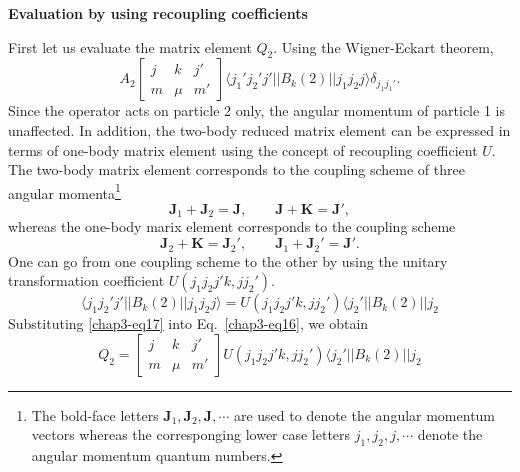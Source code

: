 \medskip
\noindent \textbf{\large Evaluation by using recoupling coefficients}
\medskip

\noindent First let us evaluate the matrix element $Q_2$. Using the Wigner-Eckart theorem,
\begin{equation}
A_2 \begin{bmatrix}j & k & j'\\m & \mu & m'\end{bmatrix}
\langle j_1' j_2' j' || B_k (2) || j_1 j_2 j \rangle \delta_{j_1 j_1'}. \label{chap3-eq16}
\end{equation}
Since the operator acts on particle 2 only, the angular momentum of particle 1 is unaffected. In addition, the two-body reduced matrix element can be expressed in terms of one-body matrix element using the concept of recoupling coefficient $U$. The two-body matrix element corresponds to the coupling scheme of three angular momenta\footnote{The bold-face letters ${\boldsymbol  J}_1, {\boldsymbol  J}_2, {\boldsymbol  J}, \cdots$ are used to denote the angular momentum vectors whereas the corresponging lower case letters $j_1, j_2, j, \cdots$ denote the angular momentum quantum numbers.}
$$
{\boldsymbol  J}_1 + {\boldsymbol  J}_2 = {\boldsymbol  J}, \qquad {\boldsymbol  J}+ {\boldsymbol  K}= {\boldsymbol  J}',
$$
whereas the one-body marix element corresponds to the coupling scheme
$$
{\boldsymbol  J}_2 + {\boldsymbol  K} = {\boldsymbol  J}_2', \qquad {\boldsymbol  J}_1+ {\boldsymbol  J}_2'= {\boldsymbol  J}'.
$$
One can go from one coupling scheme to the other by using the unitary transformation coefficient $U(j_1 j_2 j' k, j j_2')$.
\begin{equation}
\langle j_1 j_2' j' || B_k (2) || j_1 j_2 j \rangle = U (j_1 j_2 j' k, j j_2') \langle j_2' || B_k (2) || j_2 \label{chap3-eq17}
\end{equation}
Substituting \eqref{chap3-eq17} into Eq.\ \eqref{chap3-eq16}, we obtain
\begin{equation}
Q_2 = \begin{bmatrix}j & k & j'\\m & \mu & m'\end{bmatrix}
U (j_1 j_2 j' k, j j_2') \langle j_2' || B_k (2) || j_2 \label{chap3-eq18}
\end{equation}


